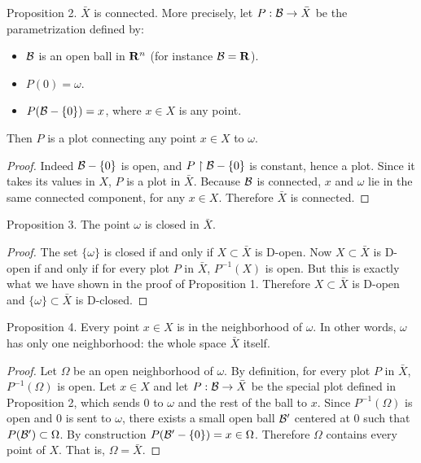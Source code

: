 \begin{Article}{Proposition 2.}{}
  $\bar X$ is connected.
  More precisely,
  let $P : \mathcal{B} \to \bar X$ be the parametrization defined by:
  \begin{itemize}
    \item $\mathcal{B}$ is an open ball in $\mathbf{R}^n$ (for instance $\mathcal{B} = \mathbf{R}$).
    \item $P(0) = \omega$.
    \item $P(\mathcal{B} - \{0\}) = x$, where $x \in X$ is any point.
  \end{itemize}
  Then $P$ is a plot connecting any point $x \in X$ to $\omega$.
\end{Article}

\begin{proof}
  Indeed $\mathcal{B} - \{0\}$ is open,
  and $P \restriction \mathcal{B} - \{0\}$ is constant,
  hence a plot.
  Since it takes its values in $X$,
  $P$ is a plot in $\bar X$.
  Because $\mathcal{B}$ is connected,
  $x$ and $\omega$ lie in the same connected component,
  for any $x \in X$.
  Therefore $\bar X$ is connected.
\end{proof}

\begin{Article}{Proposition 3.}{}
  The point $\omega$ is closed in $\bar X$.
\end{Article}

\begin{proof}
  The set $\{\omega\}$ is closed if and only if $X \subset \bar X$ is D-open.
  Now $X \subset \bar X$ is D-open if and only if for every plot $P$ in $\bar X$,
  $P^{-1}(X)$ is open.
  But this is exactly what we have shown in the proof of Proposition 1.
  Therefore $X \subset \bar X$ is D-open and $\{\omega\} \subset \bar X$ is D-closed.
\end{proof}

\begin{Article}{Proposition 4.}{}
  Every point $x \in X$ is in the neighborhood of $\omega$.
  In other words,
  $\omega$ has only one neighborhood:
  the whole space $\bar X$ itself.
\end{Article}

\begin{proof}
  Let $\Omega$ be an open neighborhood of $\omega$.
  By definition,
  for every plot $P$ in $\bar X$,
  $P^{-1}(\Omega)$ is open.
  Let $x \in X$ and let $P : \mathcal{B} \to \bar X$ be the special plot defined in Proposition 2,
  which sends $0$ to $\omega$ and the rest of the ball to $x$.
  Since $P^{-1}(\Omega)$ is open and $0$ is sent to $\omega$,
  there exists a small open ball $\mathcal{B}'$ centered at $0$ such that $P(\mathcal{B}') \subset \Omega$.
  By construction $P(\mathcal{B}' - \{0\}) = x \in \Omega$.
  Therefore $\Omega$ contains every point of $X$.
  That is,
  $\Omega = \bar X$.
\end{proof}

